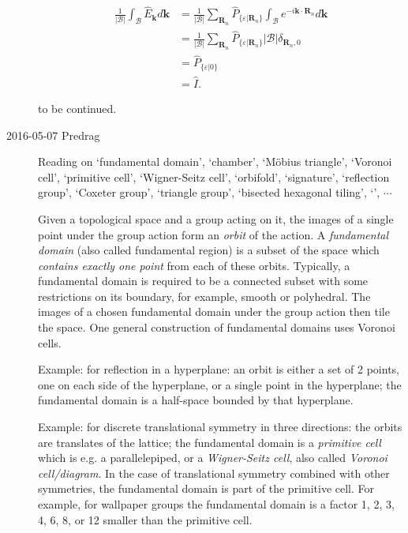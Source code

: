 \begin{description}
\begin{align*}
\frac{1}{\vert\mathcal{B}\vert}\int_{\mathcal{B}}\hat{E}_{\mathbf{k}}d\mathbf{k} & =\frac{1}{\vert\mathcal{B}\vert}\sum_{\mathbf{R}_{n}}\hat{P}_{\{\varepsilon\vert\mathbf{R}_{n}\}}\int_{\mathcal{B}}e^{-i\mathbf{k}\cdot\mathbf{R}_{n}}d\mathbf{k}\\
 & =\frac{1}{\vert\mathcal{B}\vert}\sum_{\mathbf{R}_{n}}\hat{P}_{\{\varepsilon\vert\mathbf{R}_{n}\}}\vert\mathcal{B}\vert\delta_{\mathbf{R}_{n},0}\\
 & =\hat{P}_{\{\varepsilon\vert0\}}\\
 & =\hat{I}.
\end{align*}

to be continued.

\item[2016-05-07 Predrag]                                       \toCB
Reading on
`fundamental domain',
`chamber',
`M\"obius triangle',
`Voronoi cell',
`primitive cell',
`Wigner-Seitz cell',
`orbifold',
`signature',
`reflection group',
`Coxeter group',
`triangle group',
`bisected hexagonal tiling',
`',
$\cdots$

%
Given a topological space and a group acting on it, the images of a
single point under the group action form an \emph{orbit} of the action. A
\emph{fundamental domain} (also called fundamental region) is a subset of
the space which \emph{contains exactly one point} from each of these
orbits.
Typically, a fundamental domain is required to be a connected subset with
some restrictions on its boundary, for example, smooth or polyhedral. The
images of a chosen fundamental domain under the group action then tile
the space. One general construction of fundamental domains uses Voronoi
cells.

Example: for reflection in a hyperplane: an orbit is either a set of 2
points, one on each side of the hyperplane, or a single point in the
hyperplane; the fundamental domain is a half-space bounded by that
hyperplane.

Example: for discrete translational symmetry in three directions: the
orbits are translates of the lattice; the fundamental domain is a
\emph{primitive cell} which is e.g. a parallelepiped, or a
\emph{Wigner-Seitz cell}, also called \emph{Voronoi cell/diagram}. In the
case of translational symmetry combined with other symmetries, the
fundamental domain is part of the primitive cell. For example, for
wallpaper groups the fundamental domain is a factor 1, 2, 3, 4, 6, 8, or
12 smaller than the primitive cell.


\end{description}
